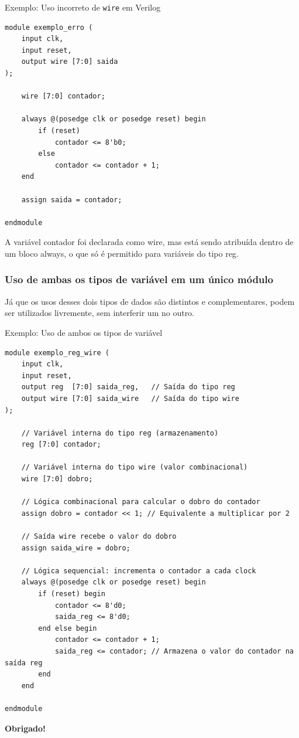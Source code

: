 \documentclass{beamer}
\begin{document}
\begin{frame}[fragile]{Exemplo: Uso incorreto de \texttt{wire} em Verilog}
\tiny
\begin{verbatim} 
module exemplo_erro (
    input clk,
    input reset,
    output wire [7:0] saida
);

    wire [7:0] contador;

    always @(posedge clk or posedge reset) begin
        if (reset)
            contador <= 8'b0;
        else
            contador <= contador + 1;
    end

    assign saida = contador;

endmodule
\end{verbatim}

\small
A variável contador foi declarada como wire, mas está sendo atribuída dentro de um bloco always, o que só é permitido para variáveis do tipo reg.
\end{frame}

\begin{frame}
\frametitle{Uso de ambas os tipos de variável em um único módulo}

Já que os usos desses dois tipos de dados são distintos e complementares, podem ser utilizados livremente, sem interferir um no outro.
\end{frame}

\begin{frame}[fragile]{Exemplo: Uso  de ambos os tipos de variável}
\tiny
\begin{verbatim}
module exemplo_reg_wire (
    input clk,
    input reset,
    output reg  [7:0] saida_reg,   // Saída do tipo reg
    output wire [7:0] saida_wire   // Saída do tipo wire
);

    // Variável interna do tipo reg (armazenamento)
    reg [7:0] contador;

    // Variável interna do tipo wire (valor combinacional)
    wire [7:0] dobro;

    // Lógica combinacional para calcular o dobro do contador
    assign dobro = contador << 1; // Equivalente a multiplicar por 2

    // Saída wire recebe o valor do dobro
    assign saida_wire = dobro;

    // Lógica sequencial: incrementa o contador a cada clock
    always @(posedge clk or posedge reset) begin
        if (reset) begin
            contador <= 8'd0;
            saida_reg <= 8'd0;
        end else begin
            contador <= contador + 1;
            saida_reg <= contador; // Armazena o valor do contador na saída reg
        end
    end

endmodule
\end{verbatim}
\end{frame}

\begin{frame}[plain]
    \centering
    {\Huge \textbf{Obrigado!}}
\end{frame}
\end{document}
